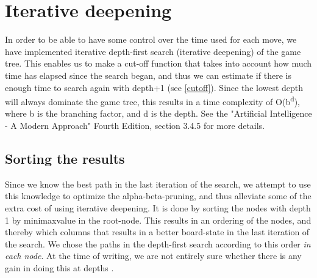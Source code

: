 \section{Iterative deepening}
In order to be able to have some control over the time used for each move, we have implemented iterative depth-first search (iterative deepening) of the game tree. This enables us to make a cut-off function that takes into account how much time has elapsed since the search began, and thus we can estimate if there is enough time to search again with depth+1 (see \ref{cutoff}). 
Since the lowest depth will always dominate the game tree, this results in a time complexity of O(b\textsuperscript{d}), where b is the branching factor, and d is the depth. See the "Artificial Intelligence - A Modern Approach" Fourth Edition, section 3.4.5 for more details.
\subsection{Sorting the results}
Since we know the best path in the last iteration of the search, we attempt to use this knowledge to optimize the alpha-beta-pruning, and thus alleviate some of the extra cost of using iterative deepening. It is done by sorting the nodes with depth 1 by minimaxvalue in the root-node. This results in an ordering of the nodes, and thereby which columns that results in a better board-state in the last iteration of the search. We chose the paths in the depth-first search according to this order \emph{in each node}. At the time of writing, we are not entirely sure whether there is any gain in doing this at depths .